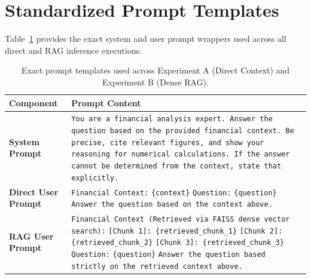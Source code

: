 \documentclass[11pt]{article}
\begin{document}
\appendix
\section{Standardized Prompt Templates}
\label{sec:app_prompts}

Table~\ref{tab:prompt_templates} provides the exact system and user prompt wrappers used across all direct and RAG inference executions.

\begin{table}[h]
\centering
\small
\begin{tabularx}{\textwidth}{lX}
\toprule
\textbf{Component} & \textbf{Prompt Content} \\
\midrule
\textbf{System Prompt} & \texttt{You are a financial analysis expert. Answer the question based on the provided financial context. Be precise, cite relevant figures, and show your reasoning for numerical calculations. If the answer cannot be determined from the context, state that explicitly.} \\
\midrule
\textbf{Direct User Prompt} & \texttt{Financial Context:} \newline
\texttt{\{context\}} \newline\newline
\texttt{Question:} \newline
\texttt{\{question\}} \newline\newline
\texttt{Answer the question based on the context above.} \\
\midrule
\textbf{RAG User Prompt} & \texttt{Financial Context (Retrieved via FAISS dense vector search):} \newline
\texttt{[Chunk 1]: \{retrieved\_chunk\_1\}} \newline
\texttt{[Chunk 2]: \{retrieved\_chunk\_2\}} \newline
\texttt{[Chunk 3]: \{retrieved\_chunk\_3\}} \newline\newline
\texttt{Question:} \newline
\texttt{\{question\}} \newline\newline
\texttt{Answer the question based strictly on the retrieved context above.} \\
\bottomrule
\end{tabularx}
\caption{Exact prompt templates used across Experiment A (Direct Context) and Experiment B (Dense RAG).}
\label{tab:prompt_templates}
\end{table}
\end{document}
